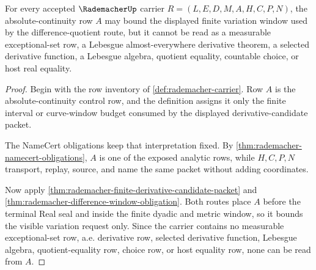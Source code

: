 \begin{theorem}
\label{thm:rademacher-absolute-continuity-boundary}
For every accepted $\RademacherUp$ carrier $R=(L,E,D,M,A,H,C,P,N)$, the absolute-continuity row $A$ may bound the displayed finite variation window used by the difference-quotient route, but it cannot be read as a measurable exceptional-set row, a Lebesgue almost-everywhere derivative theorem, a selected derivative function, a Lebesgue algebra, quotient equality, countable choice, or host real equality.
\end{theorem}
\begin{proof}
Begin with the row inventory of \autoref{def:rademacher-carrier}. Row $A$ is the absolute-continuity control row, and the definition assigns it only the finite interval or curve-window budget consumed by the displayed derivative-candidate packet.

The NameCert obligations keep that interpretation fixed. By \autoref{thm:rademacher-namecert-obligations}, $A$ is one of the exposed analytic rows, while $H,C,P,N$ transport, replay, source, and name the same packet without adding coordinates.

Now apply \autoref{thm:rademacher-finite-derivative-candidate-packet} and \autoref{thm:rademacher-difference-window-obligation}. Both routes place $A$ before the terminal Real seal and inside the finite dyadic and metric window, so it bounds the visible variation request only. Since the carrier contains no measurable exceptional-set row, a.e. derivative row, selected derivative function, Lebesgue algebra, quotient-equality row, choice row, or host equality row, none can be read from $A$.
\end{proof}

